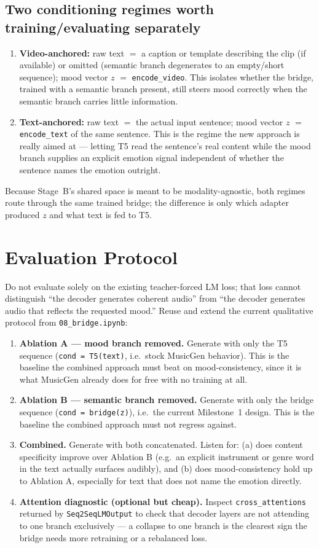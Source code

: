 \documentclass[11pt]{article}
\begin{document}
\subsection{Two conditioning regimes worth training/evaluating separately}
\begin{enumerate}
\item \textbf{Video-anchored:} raw text $=$ a caption or template describing the clip (if
available) or omitted (semantic branch degenerates to an empty/short sequence); mood vector $z$
$=$ \texttt{encode\_video}. This isolates whether the bridge, trained with a semantic branch
present, still steers mood correctly when the semantic branch carries little information.
\item \textbf{Text-anchored:} raw text $=$ the actual input sentence; mood vector $z$ $=$
\texttt{encode\_text} of the same sentence. This is the regime the new approach is really aimed
at --- letting T5 read the sentence's real content while the mood branch supplies an explicit
emotion signal independent of whether the sentence names the emotion outright.
\end{enumerate}
Because Stage~B's shared space is meant to be modality-agnostic, both regimes route through the
same trained bridge; the difference is only which adapter produced $z$ and what text is fed to T5.

\section{Evaluation Protocol}
\label{sec:eval}
Do not evaluate solely on the existing teacher-forced LM loss; that loss cannot distinguish
``the decoder generates coherent audio'' from ``the decoder generates audio that reflects the
requested mood.'' Reuse and extend the current qualitative protocol from
\texttt{08\_bridge.ipynb}:
\begin{enumerate}
\item \textbf{Ablation A --- mood branch removed.} Generate with only the T5 sequence
(\texttt{cond = T5(text)}, i.e.\ stock MusicGen behavior). This is the baseline the combined
approach must beat on mood-consistency, since it is what MusicGen already does for free with no
training at all.
\item \textbf{Ablation B --- semantic branch removed.} Generate with only the bridge sequence
(\texttt{cond = bridge(z)}), i.e.\ the current Milestone~1 design. This is the baseline the
combined approach must not regress against.
\item \textbf{Combined.} Generate with both concatenated. Listen for: (a) does content specificity
improve over Ablation B (e.g.\ an explicit instrument or genre word in the text actually surfaces
audibly), and (b) does mood-consistency hold up to Ablation A, especially for text that does not
name the emotion directly.
\item \textbf{Attention diagnostic (optional but cheap).} Inspect
\texttt{cross\_attentions} returned by \texttt{Seq2SeqLMOutput} to check that decoder layers are
not attending to one branch exclusively --- a collapse to one branch is the clearest sign the
bridge needs more retraining or a rebalanced loss.
\end{enumerate}
\end{document}
